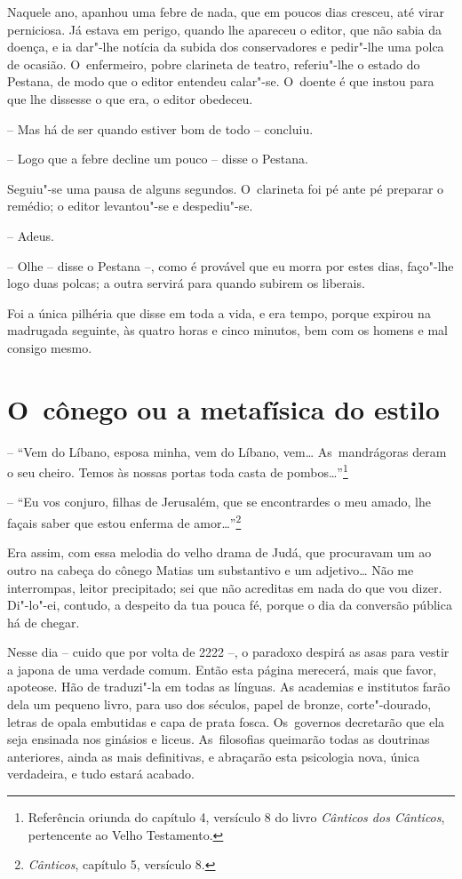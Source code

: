 Naquele ano, apanhou uma febre de nada, que em poucos dias cresceu, até
virar perniciosa. Já estava em perigo, quando lhe apareceu o editor, que
não sabia da doença, e ia dar"-lhe notícia da subida dos conservadores e
pedir"-lhe uma polca de ocasião. O~enfermeiro, pobre clarineta de teatro,
referiu"-lhe o estado do Pestana, de modo que o editor entendeu calar"-se.
O~doente é que instou para que lhe dissesse o que era, o editor
obedeceu.

-- Mas há de ser quando estiver bom de todo -- concluiu.

-- Logo que a febre decline um pouco -- disse o Pestana.

Seguiu"-se uma pausa de alguns segundos. O~clarineta foi pé ante pé
preparar o remédio; o editor levantou"-se e despediu"-se.

-- Adeus.

-- Olhe -- disse o Pestana --, como é provável que eu morra por estes
dias, faço"-lhe logo duas polcas; a outra servirá para quando subirem os
liberais.

Foi a única pilhéria que disse em toda a vida, e era tempo, porque
expirou na madrugada seguinte, às quatro horas e cinco minutos, bem com
os homens e mal consigo mesmo.

\chapter{O~cônego ou a metafísica do estilo}

-- ``Vem do Líbano, esposa minha, vem do Líbano, vem\ldots{} As~mandrágoras
deram o seu cheiro. Temos às nossas portas toda casta de
pombos\ldots{}''\footnote{Referência oriunda do capítulo 4, versículo 8 do
  livro \emph{Cânticos dos Cânticos}, pertencente ao Velho Testamento.}

-- ``Eu vos conjuro, filhas de Jerusalém, que se encontrardes o meu
amado, lhe façais saber que estou enferma de amor\ldots{}''\footnote{\emph{Cânticos},
  capítulo 5, versículo 8.}

Era assim, com essa melodia do velho drama de Judá, que procuravam um ao
outro na cabeça do cônego Matias um substantivo e um adjetivo\ldots{} Não me
interrompas, leitor precipitado; sei que não acreditas em nada do que
vou dizer. Di"-lo"-ei, contudo, a despeito da tua pouca fé, porque o dia
da conversão pública há de chegar.

Nesse dia -- cuido que por volta de 2222 --, o paradoxo despirá as asas
para vestir a japona de uma verdade comum. Então esta página merecerá,
mais que favor, apoteose. Hão de traduzi"-la em todas as línguas. As
academias e institutos farão dela um pequeno livro, para uso dos
séculos, papel de bronze, corte"-dourado, letras de opala embutidas e
capa de prata fosca. Os~governos decretarão que ela seja ensinada nos
ginásios e liceus. As~filosofias queimarão todas as doutrinas
anteriores, ainda as mais definitivas, e abraçarão esta psicologia nova,
única verdadeira, e tudo estará acabado.

